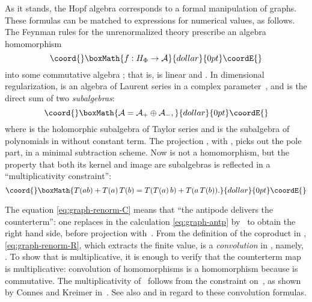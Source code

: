 \documentclass[a4paper,12pt]{article}
\providecommand{\A}{\mathcal{A}}        %
\providecommand{\eps}{\varepsilon}      %
\providecommand{\Ga}{\Gamma}            %
\DeclareMathOperator{\Hom}{Hom}     %
\providecommand{\1}{\mathbf{1}}         %
\providecommand{\7}{\dagger}            %
\providecommand{\8}{\bullet}            %
\renewcommand{\.}{\cdot}            %
\renewcommand{\:}{\colon}           %
\begin{document}
As it stands, the Hopf algebra \coordHE{} corresponds to a formal
manipulation of graphs. These formulas can be matched to expressions
for numerical values, as follows. The Feynman rules for the
unrenormalized theory prescribe an algebra homomorphism
$$\coord{}\boxMath{
f : H_\Phi \to \A
}{dollar}{0pt}\coordE{}$$
into some commutative algebra \myHighlight{$\A$}\coordHE{}; that is, \coordHE{} is linear and
\myHighlight{$f(\Ga_1 \Ga_2) = f(\Ga_1)\,f(\Ga_2)$}\coordHE{}. In dimensional regularization,
\myHighlight{$\A$}\coordHE{} is an algebra of Laurent series in a complex parameter~\myHighlight{$\eps$}\coordHE{},
and \myHighlight{$\A$}\coordHE{} is the direct sum of two \textit{subalgebras}:
$$\coord{}\boxMath{
\A = \A_+ \oplus \A_-,
}{dollar}{0pt}\coordE{}$$
where \myHighlight{$\A_+$}\coordHE{} is the holomorphic subalgebra of Taylor series and \myHighlight{$\A_-$}\coordHE{}
is the subalgebra of polynomials in \myHighlight{$1/\eps$}\coordHE{} without constant term.
The projection \myHighlight{$T\: \A \to \A_-$}\coordHE{}, with \myHighlight{$\ker T = \A_+$}\coordHE{}, picks out the
pole part, in a minimal subtraction scheme. Now \coordHE{} is not a
homomorphism, but the property that both its kernel and image are
subalgebras is reflected in a ``multiplicativity constraint'':
$$\coord{}\boxMath{
T(ab) + T(a)\,T(b) = T(T(a)\,b) + T(a\,T(b)).
}{dollar}{0pt}\coordE{}$$

The equation \eqref{eq:graph-renorm-C} means that ``the antipode
delivers the counterterm'': one replaces \coordHE{} in the calculation
\eqref{eq:graph-antp} by~\coordHE{} to obtain the right hand side, before
projection with~\coordHE{}. From the definition of the coproduct in \coordHE{},
\eqref{eq:graph-renorm-R}, which extracts the finite value, is a
\textit{convolution} in \myHighlight{$\Hom(H_\Phi,\A)$}\coordHE{}, namely, \coordHE{}. To
show that \coordHE{} is multiplicative, it is enough to verify that the
counterterm map \coordHE{} is multiplicative: convolution of homomorphisms is
a homomorphism because \myHighlight{$\A$}\coordHE{} is commutative. The multiplicativity
of~\coordHE{} follows from the constraint on~\coordHE{}, as shown by Connes and
Kreimer in~\cite{ConnesKrRHI}. See also \cite{Calypso} and
\cite{GirelliMK} in regard to these convolution formulas.
\end{document}
